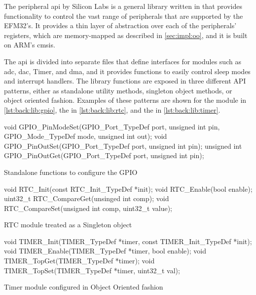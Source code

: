 The {\emlib} peripheral \gls{api} by Silicon Labs is a general library written in {\C} that provides functionality to control the vast range of peripherals that are supported by the EFM32's.
It provides a thin layer of abstraction over each of the peripherals' registers, which are memory-mapped as described in \autoref{sec:impl:oo}, and it is built on ARM's \gls{cmsis}.

The \gls{api} is divided into separate files that define interfaces for modules such as \gls{adc}, \gls{dac}, Timer, and \gls{dma}, and it provides functions to easily control sleep modes and interrupt handlers.
The library functions are exposed in three different API patterns, either as standalone utility methods, singleton object methods, or {\C} object oriented fashion.
Examples of these patterns are shown for the  module in \autoref{lst:back:lib:gpio}, the  in \autoref{lst:back:lib:rtc}, and the  in \autoref{lst:back:lib:timer}.

\begin{listing}[H]
  \begin{ccode}
void GPIO_PinModeSet(GPIO_Port_TypeDef port, unsigned int pin,
                     GPIO_Mode_TypeDef mode, unsigned int out);
void GPIO_PinOutSet(GPIO_Port_TypeDef port, unsigned int pin);
unsigned int GPIO_PinOutGet(GPIO_Port_TypeDef port,
                            unsigned int pin);
  \end{ccode}
  \caption{Standalone functions to configure the GPIO}
  \label{lst:back:lib:gpio}
\end{listing}

\begin{listing}[H]
  \begin{ccode}
void RTC_Init(const RTC_Init_TypeDef *init);
void RTC_Enable(bool enable);
uint32_t RTC_CompareGet(unsinged int comp);
void RTC_CompareSet(unsigned int comp, uint32_t value);
  \end{ccode}
  \caption{RTC module treated as a Singleton object}
  \label{lst:back:lib:rtc}
\end{listing}

\begin{listing}[H]
  \begin{ccode}
void TIMER_Init(TIMER_TypeDef *timer,
                const TIMER_Init_TypeDef *init);
void TIMER_Enable(TIMER_TypeDef *timer, bool enable);
void TIMER_TopGet(TIMER_TypeDef *timer);
void TIMER_TopSet(TIMER_TypeDef *timer, uint32_t val);
  \end{ccode}
  \caption{Timer module configured in {\C} Object Oriented fashion}
  \label{lst:back:lib:timer}
\end{listing}

